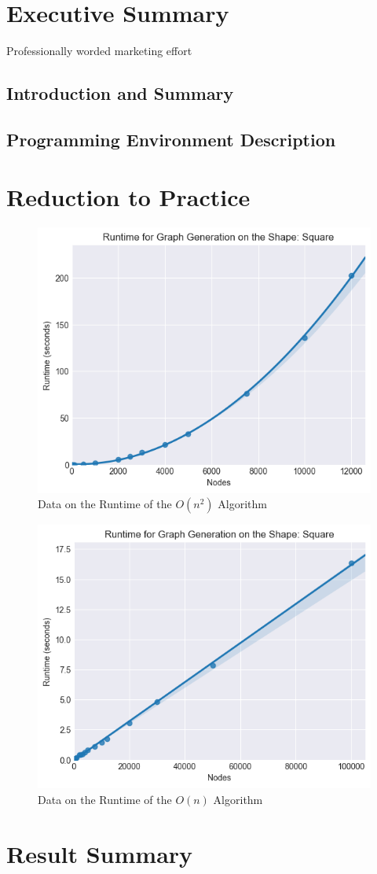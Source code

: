 \documentclass{article}
\begin{document}
\section{Executive Summary}
Professionally worded marketing effort
\subsection{Introduction and Summary}

\subsection{Programming Environment Description}

\section{Reduction to Practice}

\begin{figure}
  \centering
  \includegraphics[width=0.5 \textwidth]{square/runtime/runtime_chart_naive}
  \caption{Data on the Runtime of the $O(n^2)$ Algorithm}
\end{figure}

\begin{figure}
  \centering
  \includegraphics[width=0.5 \textwidth]{square/runtime/runtime_chart}
  \caption{Data on the Runtime of the $O(n)$ Algorithm}
\end{figure}
\section{Result Summary}
\end{document}
